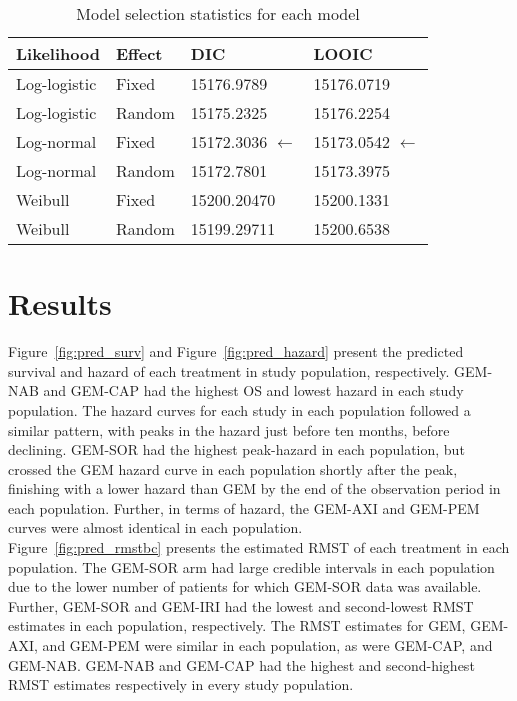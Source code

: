 \begin{table}[h]
    \centering
    \begin{tabular}{llll}
    \hline
    Likelihood   & Effect & DIC         & LOOIC      \\ \hline
    Log-logistic & Fixed  & 15176.9789  & 15176.0719 \\
    Log-logistic & Random & 15175.2325  & 15176.2254 \\
    Log-normal   & Fixed  & 15172.3036 $\leftarrow$ & 15173.0542 $\leftarrow$ \\
    Log-normal   & Random & 15172.7801  & 15173.3975 \\
    Weibull      & Fixed  & 15200.20470 & 15200.1331 \\
    Weibull      & Random & 15199.29711 & 15200.6538 \\ \hline
    \end{tabular}
    \caption{Model selection statistics for each model}
    \label{tab:selectionstatbc}
\end{table}

\section{Results}
Figure~\ref{fig:pred_surv} and Figure~\ref{fig:pred_hazard} present the predicted survival and hazard of each treatment in study population, respectively. GEM-NAB and GEM-CAP had the highest OS and lowest hazard in each study population. The hazard curves for each study in each population followed a similar pattern, with peaks in the hazard just before ten months, before declining. GEM-SOR had the highest peak-hazard in each population, but crossed the GEM hazard curve in each population shortly after the peak, finishing with a lower hazard than GEM by the end of the observation period in each population. Further, in terms of hazard, the GEM-AXI and GEM-PEM curves were almost identical in each population. \\

Figure~\ref{fig:pred_rmstbc} presents the estimated RMST of each treatment in each population. The GEM-SOR arm had large credible intervals in each population due to the lower number of patients for which GEM-SOR data was available. Further, GEM-SOR and GEM-IRI had the lowest and second-lowest RMST estimates in each population, respectively. The RMST estimates for GEM, GEM-AXI, and GEM-PEM were similar in each population, as were GEM-CAP, and GEM-NAB. GEM-NAB and GEM-CAP had the highest and second-highest RMST estimates respectively in every study population. \\

